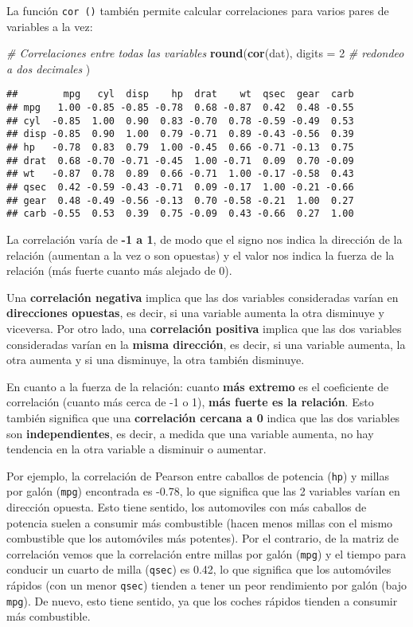 \documentclass[
]{book}
\newenvironment{Shaded}{\begin{snugshade}}{\end{snugshade}}
\newcommand{\CommentTok}[1]{\textcolor[rgb]{0.56,0.35,0.01}{\textit{#1}}}
\newcommand{\DataTypeTok}[1]{\textcolor[rgb]{0.13,0.29,0.53}{#1}}
\newcommand{\DecValTok}[1]{\textcolor[rgb]{0.00,0.00,0.81}{#1}}
\newcommand{\KeywordTok}[1]{\textcolor[rgb]{0.13,0.29,0.53}{\textbf{#1}}}
\newcommand{\NormalTok}[1]{#1}
\begin{document}
La función \texttt{cor\ ()} también permite calcular correlaciones para varios pares de variables a la vez:

\begin{Shaded}
\begin{Highlighting}[]
\CommentTok{# Correlaciones entre todas las variables}
\KeywordTok{round}\NormalTok{(}\KeywordTok{cor}\NormalTok{(dat),}
      \DataTypeTok{digits =} \DecValTok{2} \CommentTok{# redondeo a dos decimales}
\NormalTok{      ) }
\end{Highlighting}
\end{Shaded}

\begin{verbatim}
##        mpg   cyl  disp    hp  drat    wt  qsec  gear  carb
## mpg   1.00 -0.85 -0.85 -0.78  0.68 -0.87  0.42  0.48 -0.55
## cyl  -0.85  1.00  0.90  0.83 -0.70  0.78 -0.59 -0.49  0.53
## disp -0.85  0.90  1.00  0.79 -0.71  0.89 -0.43 -0.56  0.39
## hp   -0.78  0.83  0.79  1.00 -0.45  0.66 -0.71 -0.13  0.75
## drat  0.68 -0.70 -0.71 -0.45  1.00 -0.71  0.09  0.70 -0.09
## wt   -0.87  0.78  0.89  0.66 -0.71  1.00 -0.17 -0.58  0.43
## qsec  0.42 -0.59 -0.43 -0.71  0.09 -0.17  1.00 -0.21 -0.66
## gear  0.48 -0.49 -0.56 -0.13  0.70 -0.58 -0.21  1.00  0.27
## carb -0.55  0.53  0.39  0.75 -0.09  0.43 -0.66  0.27  1.00
\end{verbatim}

La correlación varía de \textbf{-1 a 1}, de modo que el signo nos indica la dirección de la relación (aumentan a la vez o son opuestas) y el valor nos indica la fuerza de la relación (más fuerte cuanto más alejado de 0).

Una \textbf{correlación negativa} implica que las dos variables consideradas varían en \textbf{direcciones opuestas}, es decir, si una variable aumenta la otra disminuye y viceversa. Por otro lado, una \textbf{correlación positiva} implica que las dos variables consideradas varían en la \textbf{misma dirección}, es decir, si una variable aumenta, la otra aumenta y si una disminuye, la otra también disminuye.

En cuanto a la fuerza de la relación: cuanto \textbf{más extremo} es el coeficiente de correlación (cuanto más cerca de -1 o 1), \textbf{más fuerte es la relación}. Esto también significa que una \textbf{correlación cercana a 0} indica que las dos variables son \textbf{independientes}, es decir, a medida que una variable aumenta, no hay tendencia en la otra variable a disminuir o aumentar.

Por ejemplo, la correlación de Pearson entre caballos de potencia (\texttt{hp}) y millas por galón (\texttt{mpg}) encontrada es -0.78, lo que significa que las 2 variables varían en dirección opuesta. Esto tiene sentido, los automoviles con más caballos de potencia suelen a consumir más combustible (hacen menos millas con el mismo combustible que los automóviles más potentes). Por el contrario, de la matriz de correlación vemos que la correlación entre millas por galón (\texttt{mpg}) y el tiempo para conducir un cuarto de milla (\texttt{qsec}) es 0.42, lo que significa que los automóviles rápidos (con un menor \texttt{qsec}) tienden a tener un peor rendimiento por galón (bajo \texttt{mpg}). De nuevo, esto tiene sentido, ya que los coches rápidos tienden a consumir más combustible.
\end{document}
